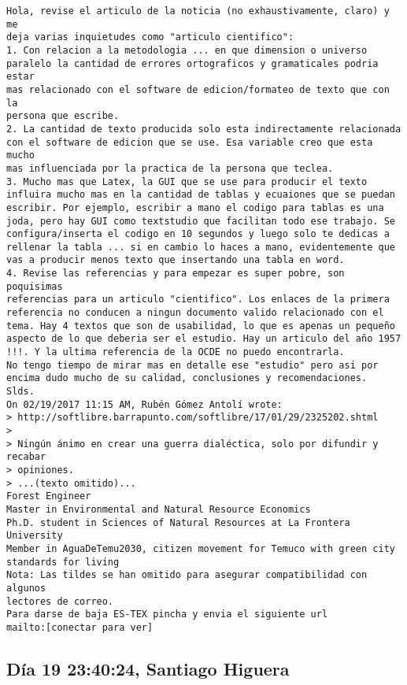 \documentclass[a4paper,10pt]{article}
\begin{document}
\begin{lstlisting}
Hola, revise el articulo de la noticia (no exhaustivamente, claro) y me 
deja varias inquietudes como "articulo cientifico":
1. Con relacion a la metodologia ... en que dimension o universo 
paralelo la cantidad de errores ortograficos y gramaticales podria estar 
mas relacionado con el software de edicion/formateo de texto que con la 
persona que escribe.
2. La cantidad de texto producida solo esta indirectamente relacionada 
con el software de edicion que se use. Esa variable creo que esta mucho 
mas influenciada por la practica de la persona que teclea.
3. Mucho mas que Latex, la GUI que se use para producir el texto 
influira mucho mas en la cantidad de tablas y ecuaiones que se puedan 
escribir. Por ejemplo, escribir a mano el codigo para tablas es una 
joda, pero hay GUI como textstudio que facilitan todo ese trabajo. Se 
configura/inserta el codigo en 10 segundos y luego solo te dedicas a 
rellenar la tabla ... si en cambio lo haces a mano, evidentemente que 
vas a producir menos texto que insertando una tabla en word.
4. Revise las referencias y para empezar es super pobre, son poquisimas 
referencias para un articulo "cientifico". Los enlaces de la primera 
referencia no conducen a ningun documento valido relacionado con el 
tema. Hay 4 textos que son de usabilidad, lo que es apenas un pequeño 
aspecto de lo que deberia ser el estudio. Hay un articulo del año 1957 
!!!. Y la ultima referencia de la OCDE no puedo encontrarla.
No tengo tiempo de mirar mas en detalle ese "estudio" pero asi por 
encima dudo mucho de su calidad, conclusiones y recomendaciones.
Slds.
On 02/19/2017 11:15 AM, Rubén Gómez Antolí wrote:
> http://softlibre.barrapunto.com/softlibre/17/01/29/2325202.shtml
>
> Ningún ánimo en crear una guerra dialéctica, solo por difundir y recabar
> opiniones.
> ...(texto omitido)...
Forest Engineer
Master in Environmental and Natural Resource Economics
Ph.D. student in Sciences of Natural Resources at La Frontera University
Member in AguaDeTemu2030, citizen movement for Temuco with green city 
standards for living
Nota: Las tildes se han omitido para asegurar compatibilidad con algunos 
lectores de correo.
Para darse de baja ES-TEX pincha y envia el siguiente url
mailto:[conectar para ver]

\end{lstlisting}

\subsection{Día 19 23:40:24, Santiago Higuera}
\end{document}
